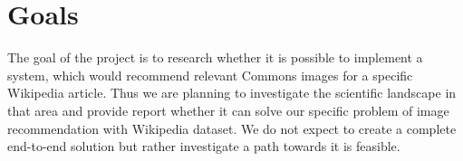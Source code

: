 \documentclass[runningheads]{llncs}
\begin{document}
\section{Goals}
The goal of the project is to research whether it is possible to implement a system, which would recommend relevant Commons\cite{ref_wiki_commons} images for a specific Wikipedia article. Thus we are planning to investigate the scientific landscape in that area and provide report whether it can solve our specific problem of image recommendation with Wikipedia dataset. We do not expect to create a complete end-to-end solution but rather investigate a path towards it is feasible.

%
%
%
% 
% 
%
\end{document}
